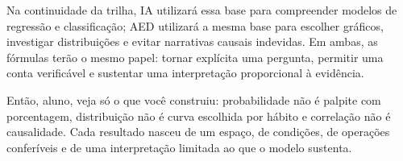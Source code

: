 Na continuidade da trilha, IA utilizará essa base para compreender modelos de regressão e classificação; AED utilizará a mesma base para escolher gráficos, investigar distribuições e evitar narrativas causais indevidas. Em ambas, as fórmulas terão o mesmo papel: tornar explícita uma pergunta, permitir uma conta verificável e sustentar uma interpretação proporcional à evidência.

\begin{SummaryBox}
Então, aluno, veja só o que você construiu: probabilidade não é palpite com porcentagem, distribuição não é curva escolhida por hábito e correlação não é causalidade. Cada resultado nasceu de um espaço, de condições, de operações conferíveis e de uma interpretação limitada ao que o modelo sustenta.
\end{SummaryBox}
